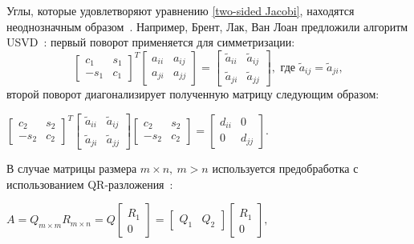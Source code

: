 Углы, которые удовлетворяют уравнению \eqref{two-sided Jacobi}, находятся неоднозначным образом~\cite{Dongarra2018}. Например, Брент, Лак, Ван Лоан предложили алгоритм USVD~\cite{10.5555/867597}: первый поворот применяется для симметризации:
\begin{equation}
\begin{bmatrix}
    c_1&s_1\\
    -s_1&c_1
\end{bmatrix}^T
\begin{bmatrix}
    a_{ii}&a_{ij}\\
    a_{ji}&a_{jj}
\end{bmatrix} = 
\begin{bmatrix}
    \tilde{a}_{ii}&\tilde{a}_{ij}\\
    \tilde{a}_{ji}&\tilde{a}_{jj}
\end{bmatrix}, \text{ где } \tilde{a}_{ij} = \tilde{a}_{ji},
\end{equation}
второй поворот диагонализирует полученную матрицу следующим образом: \begin{center}
$\begin{bmatrix}
    c_2&s_2\\
    -s_2&c_2
\end{bmatrix}^T
\begin{bmatrix}
     \tilde{a}_{ii}&\tilde{a}_{ij}\\
    \tilde{a}_{ji}&\tilde{a}_{jj}
\end{bmatrix}
\begin{bmatrix}
    c_2&s_2\\
    -s_2&c_2
\end{bmatrix} = 
\begin{bmatrix}
    d_{ii}&0\\
    0&d_{jj}
\end{bmatrix}.$
\end{center}
В случае матрицы размера $m \times n, \ m>n$ используется предобработка с использованием QR-разложения~\cite{10.5555/867597}: 
\begin{center}
    $A = Q_{m\times m}R_{m\times n} = Q\begin{bmatrix}
        R_1\\0
    \end{bmatrix} = \begin{bmatrix}
        Q_1&Q_2
    \end{bmatrix}
    \begin{bmatrix}
        R_1\\0
    \end{bmatrix},
    $
\end{center}
